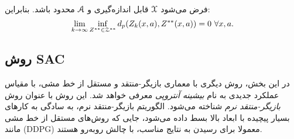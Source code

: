 فرض می‌شود 
$\EuScript{X}$
قابل اندازه‌گیری و 
$\EuScript{A}$
محدود باشد.
بنابراین:
$$\lim_{k\to\infty} \inf_{Z^{**} \in \EuScript{Z}^{**}} d_p (Z_k (x,a), Z^{**}(x,a)) = 0  \ \forall x,a.$$

\subsection{روش SAC}
در این بخش، روش دیگری با معماری  بازیگر-منتقد و مستقل از خط مشی، با مقیاس عملکرد جدیدی به نام
\textit{بیشینه آنتروپی}
معرفی خواهد شد.
این روش با عنوان روش	
\textit{بازیگر-منتقد نرم}
شناخته می‌شود.
الگوریتم  بازیگر-منتقد نرم، به سادگی به کارهای بسیار پیچیده با ابعاد بالا بسط داده می‌شود، جایی که روش‌های مستقل از خط مشی‌ مانند
\lr(DDPG)
  معمولا برای رسیدن به نتایج مناسب، با چالش روبه‌رو هستند.
  
